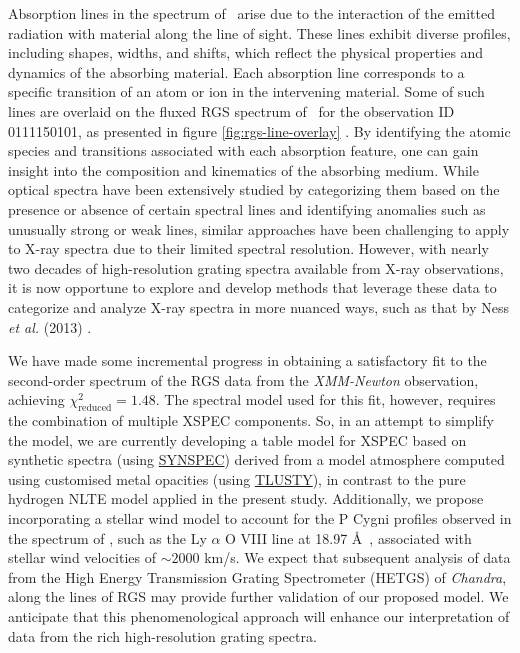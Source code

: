     Absorption lines in the spectrum of \source\ arise due to the interaction of the emitted radiation with material along the line of sight. These lines exhibit diverse profiles, including shapes, widths, and shifts, which reflect the physical properties and dynamics of the absorbing material. Each absorption line corresponds to a specific transition of an atom or ion in the intervening material. Some of such lines are overlaid on the fluxed RGS spectrum of \source\ for the observation ID 0111150101, as presented in figure \ref{fig:rgs-line-overlay} \cite{bhattacharya2020python}. By identifying the atomic species and transitions associated with each absorption feature, one can gain insight into the composition and kinematics of the absorbing medium. While optical spectra have been extensively studied by categorizing them based on the presence or absence of certain spectral lines and identifying anomalies such as unusually strong or weak lines, similar approaches have been challenging to apply to X-ray spectra due to their limited spectral resolution. However, with nearly two decades of high-resolution grating spectra available from X-ray observations, it is now opportune to explore and develop methods that leverage these data to categorize and analyze X-ray spectra in more nuanced ways, such as that by Ness \textit{et al.} (2013) \cite{ness2013obscuration}.
    
    We have made some incremental progress in obtaining a satisfactory fit to the second-order spectrum of the RGS data from the \textit{XMM-Newton} observation, achieving $\chi^2_\text{reduced}=1.48$. The spectral model used for this fit, however, requires the combination of multiple XSPEC components. So, in an attempt to simplify the model, we are currently developing a table model for XSPEC based on synthetic spectra (using %
    \href{http://tlusty.oca.eu/Synspec49/synspec.html}{SYNSPEC}) derived from a model atmosphere computed using customised metal opacities (using %
    \href{http://tlusty.oca.eu/}{TLUSTY}), in contrast to the pure hydrogen NLTE model applied in the present study. Additionally, we propose incorporating a stellar wind model to account for the P Cygni profiles observed in the spectrum of \source, such as the Ly $\alpha$ O VIII line at 18.97 \AA\ , associated with stellar wind velocities of $\sim 2000$ km/s. We expect that subsequent analysis of data from the High Energy Transmission Grating Spectrometer (HETGS) of \textit{Chandra}, along the lines of RGS may provide further validation of our proposed model. We anticipate that this phenomenological approach will enhance our interpretation of data from the rich high-resolution grating spectra.
    
